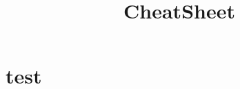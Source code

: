 \documentclass[english]{latex4ei/latex4ei_sheet}
\title{CheatSheet}
\begin{document}
\maketitle   %



\section{test}




\end{document}
